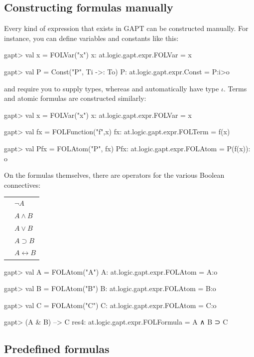\documentclass[a4paper,11pt]{book}
\newcommand{\cli}[1]{{\ttfamily {#1}}}
\begin{document}
\subsection{Constructing formulas manually}
Every kind of expression that exists in GAPT can be constructed manually. For instance, you can define variables
and constants like this:
\begin{clilisting}
gapt> val x = FOLVar("x")
x: at.logic.gapt.expr.FOLVar = x

gapt> val P = Const("P", Ti ->: To)
P: at.logic.gapt.expr.Const = P:i>o

\end{clilisting}
\cli{Var} and \cli{Const} require you to supply types, whereas \cli{FOLVar} and
\cli{FOLConst} automatically have type $\iota$. Terms and atomic formulas are constructed
similarly:
\begin{clilisting}
gapt> val x = FOLVar("x")
x: at.logic.gapt.expr.FOLVar = x

gapt> val fx = FOLFunction("f",x)
fx: at.logic.gapt.expr.FOLTerm = f(x)

gapt> val Pfx = FOLAtom("P", fx)
Pfx: at.logic.gapt.expr.FOLAtom = P(f(x)): o

\end{clilisting}

On the formulas themselves, there are operators for the various Boolean connectives:

\begin{tabular}{r l}
 \cli{-A} & $\neg A$\\
 \cli{A \& B} & $A \wedge B$\\
 \cli{A | B} & $A \vee B$\\
 \cli{A --> B} & $A \supset B$\\
 \cli{A <-> B} & $A \leftrightarrow B$
\end{tabular}
 
\begin{clilisting}
gapt> val A = FOLAtom("A")
A: at.logic.gapt.expr.FOLAtom = A:o

gapt> val B = FOLAtom("B")
B: at.logic.gapt.expr.FOLAtom = B:o

gapt> val C = FOLAtom("C")
C: at.logic.gapt.expr.FOLAtom = C:o

gapt> (A & B) --> C
res4: at.logic.gapt.expr.FOLFormula = A ∧ B ⊃ C

\end{clilisting}

\subsection{Predefined formulas}
\end{document}

